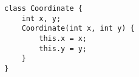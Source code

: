 \begin{lstlisting}
class Coordinate {
    int x, y;
    Coordinate(int x, int y) {
        this.x = x;
        this.y = y;
    }
}
\end{lstlisting}
